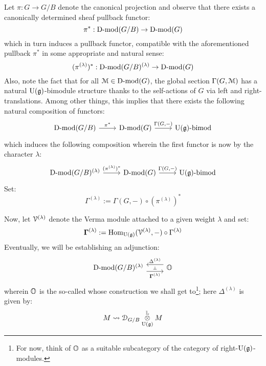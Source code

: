             Let $\pi: G \to G/B$ denote the canonical projection and observe that there exists a canonically determined sheaf pullback functor:
                $$\pi^*: \mathrm{D}\text{-}\mathrm{mod}(G/B) \to \mathrm{D}\text{-}\mathrm{mod}(G)$$
            which in turn induces a  pullback functor, compatible with the aforementioned pullback $\pi^*$ in some appropriate and natural sense:
                $$(\pi^{(\lambda)})^*: \mathrm{D}\text{-}\mathrm{mod}(G/B)^{(\lambda)} \to \mathrm{D}\text{-}\mathrm{mod}(G)$$
            Also, note the fact that for all $\mathcal{M} \in \mathrm{D}\text{-}\mathrm{mod}(G)$, the global section $\Gamma(G, \mathcal{M})$ has a natural $\mathrm{U}(\mathfrak{g})$-bimodule structure thanks to the self-actions of $G$ via left and right-translations. Among other things, this implies that there exists the following natural composition of functors:
                $$
                    \begin{tikzcd}
                    	{\Dmod(G/B}) & {\Dmod(G)} & {\U(\g)\bimod}
                    	\arrow["{\pi^*}", from=1-1, to=1-2]
                    	\arrow["{\Gamma(G, -)}", from=1-2, to=1-3]
                    \end{tikzcd}
                $$
            which induces the following composition wherein the first functor is now  by the character $\lambda$:
                $$
                    \begin{tikzcd}
                    	{\Dmod(G/B)^{(\lambda)}} & {\Dmod(G)} & {\U(\g)\bimod}
                    	\arrow["{(\pi^{(\lambda)})^*}", from=1-1, to=1-2]
                    	\arrow["{\Gamma(G, -)}", from=1-2, to=1-3]
                    \end{tikzcd}
                $$
            Set:
                $$\Gamma^{(\lambda)} := \Gamma(G, -) \circ (\pi^{(\lambda)})^*$$
            
            Now, let $\mathcal{V}^{(\lambda)}$ denote the Verma module attached to a given weight $\lambda$ and set:
                $$\mathbf{\Gamma}^{(\lambda)} := \mathrm{Hom}_{\mathrm{U}(\mathfrak{g})}(\mathcal{V}^{(\lambda)}, -) \circ \Gamma^{(\lambda)}$$
            Eventually, we will be establishing an adjunction:
                $$
                    \begin{tikzcd}
                    	{\Dmod(G/B)^{(\lambda)}} & \O
                    	\arrow[""{name=0, anchor=center, inner sep=0}, "{\bfGamma^{(\lambda)}}"', shift right=2, from=1-1, to=1-2]
                    	\arrow[""{name=1, anchor=center, inner sep=0}, "{\Delta^{(\lambda)}}"', shift right=2, from=1-2, to=1-1]
                    	\arrow["\dashv"{anchor=center, rotate=-90}, draw=none, from=1, to=0]
                    \end{tikzcd}
                $$
            wherein $\mathbb{O}$ is the so-called  whose construction we shall get to\footnote{For now, think of $\mathbb{O}$ as a suitable subcategory of the category of right-$\mathrm{U}(\mathfrak{g})$-modules.}; here $\Delta^{(\lambda)}$ is given by:
                $$M \mapsto \D_{G/B} \tensor^{\L}_{\U(\g)} M$$
                
